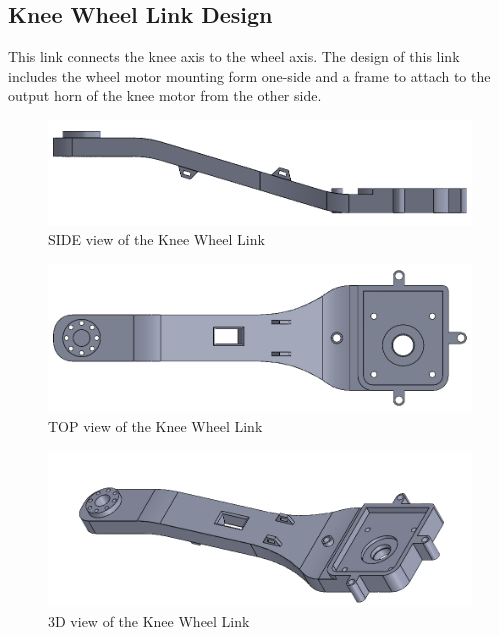 \newpage
\subsection{Knee Wheel Link Design}
This link connects the knee axis to the wheel axis. The design of this link includes the wheel motor mounting form one-side and a frame to attach to the output horn of the knee motor from the other side.
\begin{figure}[h]
	\centering
	\includegraphics[width=1\linewidth]{Wheel_Knee_Link_1}
	\caption[SIDE view of the Knee Wheel Link]{SIDE view of the Knee Wheel Link}
	\label{fig:wheelkneelink1}
\end{figure}
\begin{figure}[h]
	\centering
	\includegraphics[width=1\linewidth]{Wheel_Knee_Link_2}
	\caption[TOP view of the Knee Wheel Link]{TOP view of the Knee Wheel Link}
	\label{fig:wheelkneelink2}
\end{figure}
\begin{figure}[h]
	\centering
	\includegraphics[width=1\linewidth]{Wheel_Knee_Link_3}
	\caption[3D view of the Knee Wheel Link]{3D view of the Knee Wheel Link}
	\label{fig:wheelkneelink3}
\end{figure}


